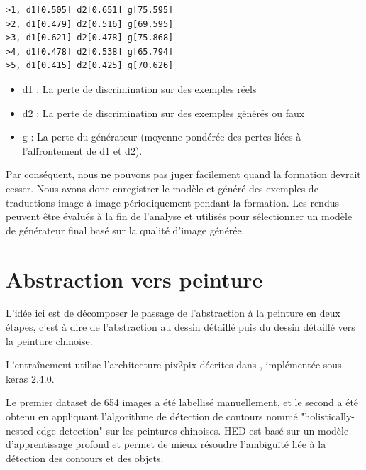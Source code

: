 \documentclass[a4paper, 12pt]{report}
\begin{document}
\vspace*{\baselineskip}

\begin{lstlisting}
>1, d1[0.505] d2[0.651] g[75.595]
>2, d1[0.479] d2[0.516] g[69.595]
>3, d1[0.621] d2[0.478] g[75.868]
>4, d1[0.478] d2[0.538] g[65.794]
>5, d1[0.415] d2[0.425] g[70.626]
\end{lstlisting}

\vspace*{\baselineskip}

\begin{itemize}
\item d1 : La perte de discrimination sur des exemples réels
\item d2 : La perte de discrimination sur des exemples générés ou faux
\item g : La perte du générateur (moyenne pondérée des pertes liées à l’affrontement de d1 et d2).
\end{itemize}

\vspace*{\baselineskip}

Par conséquent, nous ne pouvons pas juger facilement quand la formation devrait cesser. Nous avons donc enregistrer le modèle et généré des exemples de traductions image-à-image périodiquement pendant la formation. Les rendus peuvent être évalués à la fin de l’analyse et utilisés pour sélectionner un modèle de générateur final basé sur la qualité d’image générée. 



\pagebreak



\section{Abstraction vers peinture}

L'idée ici est de décomposer le passage de l'abstraction à la peinture en deux étapes, c'est à dire de l'abstraction au dessin détaillé puis du dessin détaillé vers la peinture chinoise.

L'entraînement utilise l'architecture pix2pix décrites dans \cite{DBLP:journals/corr/GatysEB15a}, implémentée sous keras 2.4.0.

Le premier dataset de 654 images a été labellisé manuellement, et le second a été obtenu en appliquant l'algorithme de détection de contours nommé "holistically-nested edge detection" \cite{xie2015holisticallynested} sur les peintures chinoises. HED est basé sur un modèle d'apprentissage profond et permet de mieux résoudre l’ambiguïté liée à la détection des contours et des objets. 
\end{document}
